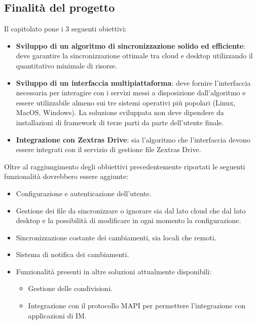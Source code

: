 \subsection{Finalità del progetto}
Il capitolato pone i 3 seguenti obiettivi:
\begin{itemize}
\item \textbf{Sviluppo di un algoritmo di sincronizzazione solido ed efficiente}: deve garantire la sincronizzazione ottimale tra cloud e desktop utilizzando il quantitativo minimale di risorse.
\item \textbf{Sviluppo di un interfaccia multipiattaforma}: deve fornire l'interfaccia necessaria per interagire con i servizi messi a disposizione 
dall'algoritmo e essere utilizzabile almeno sui tre sistemi operativi più popolari (Linux, MacOS, Windows). 
La soluzione sviluppata non deve dipendere da installazioni di framework di terze parti da parte dell'utente finale.
\item \textbf{Integrazione con Zextras Drive}: sia l'algoritmo che l'interfaccia devono essere integrati con il servizio di gestione file Zextras Drive.
\end{itemize}
Oltre al raggiungimento degli obbiettivi precedentemente riportati le seguenti funzionalità dovrebbero essere aggiunte:
\begin{itemize}
\item Configurazione e autenticazione dell'utente.
\item Gestione dei file da sincronizzare o ignorare sia dal lato cloud che dal lato desktop e la possibilità di modificare in ogni momento la configurazione.
\item Sincronizzazione costante dei cambiamenti, sia locali che remoti.
\item Sistema di notifica dei cambiamenti.
\item Funzionalità presenti in altre soluzioni attualmente disponibili:
	\begin{itemize}
	\item Gestione delle condivisioni.
	\item Integrazione con il protocollo MAPI per permettere l'integrazione con applicazioni di IM.
	\end{itemize}
\end{itemize}

